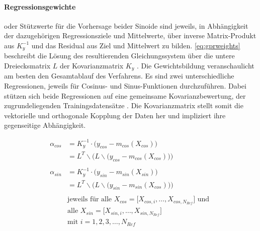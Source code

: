 \paragraph*{Regressionsgewichte} oder Stützwerte für die Vorhersage beider Sinoide sind jeweils, in Abhängigkeit der dazugehörigen Regressionsziele und Mittelwerte, über inverse Matrix-Produkt aus $K_y^{-1}$ und das Residual aus Ziel und Mittelwert zu bilden. \autoref{eq:gprweights} beschreibt die Lösung des resultierenden Gleichungssystem über die untere Dreiecksmatrix $L$ der Kovarianzmatrix $K_y$ \cite{Rasmussen2006}. Die Gewichtsbildung veranschaulicht am besten den Gesamtablauf des Verfahrens. Es sind zwei unterschiedliche Regressionen, jeweils für Cosinus- und Sinus-Funktionen durchzuführen. Dabei stützen sich beide Regressionen auf eine gemeinsame Kovarianzbewertung, der zugrundeliegenden Trainingsdatensätze \cite{Schuethe2020}. Die Kovarianzmatrix stellt somit die vektorielle und orthogonale Kopplung der Daten her und impliziert ihre gegenseitige Abhängigkeit.


\begin{align}\label{eq:gprweights}
	\alpha_{cos} &= K_y^{-1} \cdot \big( y_{cos} - m_{cos}(X_{cos}) \big) \nonumber \\
				 &= L^T \backslash \Big(L \backslash \big( y_{cos} - m_{cos}(X_{cos}) \big) \Big) \nonumber \\
	\\
	\alpha_{sin} &= K_y^{-1} \cdot \big( y_{sin} - m_{sin}(X_{sin}) \big) \nonumber \\
				 &= L^T \backslash \Big(L \backslash \big( y_{sin} - m_{sin}(X_{cos}) \big) \Big) \nonumber \\
	\nonumber \\
& \text{jeweils für alle } X_{cos} = \big[ X_{cos,i},\dots, X_{cos,N_{Ref}} \big] \text{ und } \nonumber \\
& \text{alle } X_{sin} = \big[ X_{sin,i},\dots, X_{sin,N_{Ref}} \big] \nonumber \\
& \text{mit } i = 1,2,3,\ldots,N_{Ref} \nonumber
\end{align}


\clearpage


